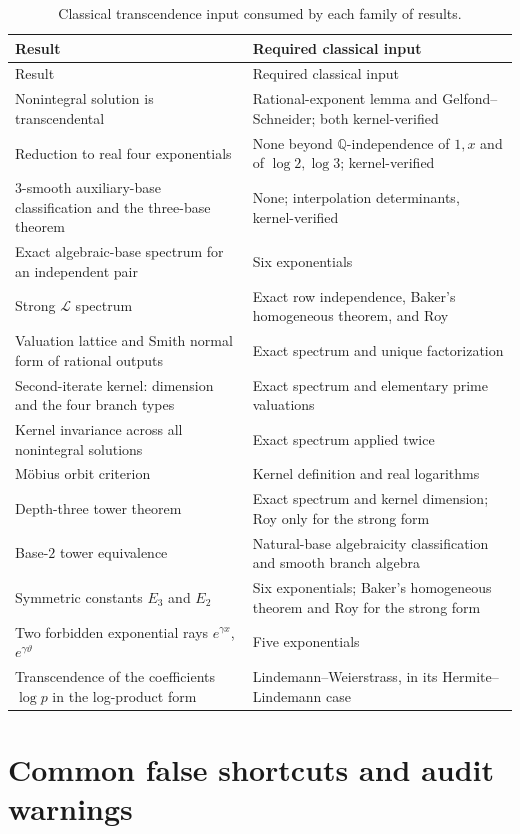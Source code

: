\documentclass[11pt,oneside]{article}
\theoremstyle{definition}
\theoremstyle{remark}
\newcommand{\Q}{\mathbb Q}
\newcommand{\thetaq}{\vartheta}
\newcommand{\LL}{\mathcal L}
\begin{document}
\begin{longtable}{p{}p{}}
\caption{Classical transcendence input consumed by each family of results.}%
\label{a4:tab:deps}\\
\toprule
Result & Required classical input \\
\midrule
\endfirsthead
\toprule
Result & Required classical input \\
\midrule
\endhead
Nonintegral solution is transcendental &
Rational-exponent lemma and Gelfond--Schneider; both kernel-verified \\
Reduction to real four exponentials &
None beyond $\Q$-independence of $1,x$ and of $\log2,\log3$; kernel-verified \\
$3$-smooth auxiliary-base classification and the three-base theorem &
None; interpolation determinants, kernel-verified \\
Exact algebraic-base spectrum for an independent pair &
Six exponentials \\
Strong $\LL$ spectrum &
Exact row independence, Baker's homogeneous theorem, and Roy \\
Valuation lattice and Smith normal form of rational outputs &
Exact spectrum and unique factorization \\
Second-iterate kernel: dimension and the four branch types &
Exact spectrum and elementary prime valuations \\
Kernel invariance across all nonintegral solutions &
Exact spectrum applied twice \\
M\"obius orbit criterion &
Kernel definition and real logarithms \\
Depth-three tower theorem &
Exact spectrum and kernel dimension; Roy only for the strong form \\
Base-$2$ tower equivalence &
Natural-base algebraicity classification and smooth branch algebra \\
Symmetric constants $E_3$ and $E_2$ &
Six exponentials; Baker's homogeneous theorem and Roy for the strong form \\
Two forbidden exponential rays $e^{\gamma x}$, $e^{\gamma\thetaq}$ &
Five exponentials \\
Transcendence of the coefficients $\log p$ in the log-product form &
Lindemann--Weierstrass, in its Hermite--Lindemann case \\
\bottomrule
\end{longtable}

\section{Common false shortcuts and audit warnings}\label{app:falseshortcuts}
\end{document}
